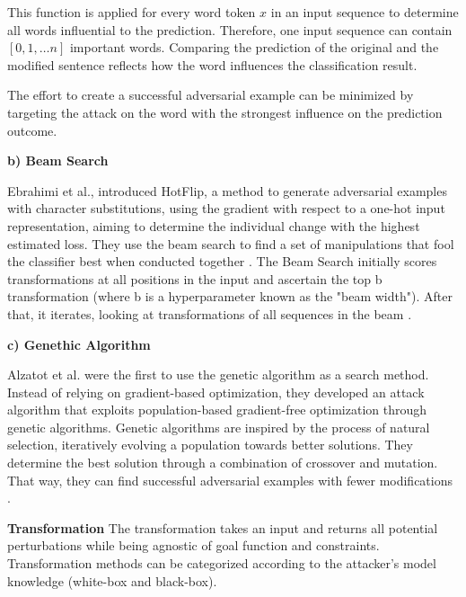            

            This function is applied for every word token $x$ in an input sequence to determine all words influential to the prediction. Therefore, one input sequence can contain $[0,1, \dots n]$ important words. 
            Comparing the prediction of the original and the modified sentence reflects how the word influences the classification result.  

         The effort to create a successful adversarial example can be minimized by targeting the attack on the word with the strongest influence on the prediction outcome. 
        
    \textbf{b) Beam Search}
    
        Ebrahimi et al., introduced HotFlip, a method to generate adversarial examples with character substitutions, using the gradient with respect to a one-hot input representation, aiming to determine the individual change with the highest estimated loss. They use the beam search to find a set of manipulations that fool the classifier best when conducted together \cite{ebrahimi2017hotflip}. The Beam Search initially scores transformations at all positions in the input and ascertain the top b transformation (where b is a hyperparameter known as the "beam width"). After that, it iterates, looking at transformations of all sequences in the beam \cite{tillmann2003word}. 
        
    \textbf{c) Genethic Algorithm}
    
        Alzatot et al. were the first to use the genetic algorithm as a search method. Instead of relying on gradient-based optimization, they developed an attack algorithm that exploits population-based gradient-free optimization through genetic algorithms. Genetic algorithms are inspired by the process of natural selection, iteratively evolving a population towards better solutions. They determine the best solution through a combination of crossover and mutation. That way, they can find successful adversarial examples with fewer modifications \cite{alzantot2018generating}.
        
        
\textbf{Transformation}
\label{sec:transformation}
    The transformation takes an input and returns all potential perturbations while being agnostic of goal function and constraints. Transformation methods can be categorized according to the attacker's model knowledge (white-box and black-box).

